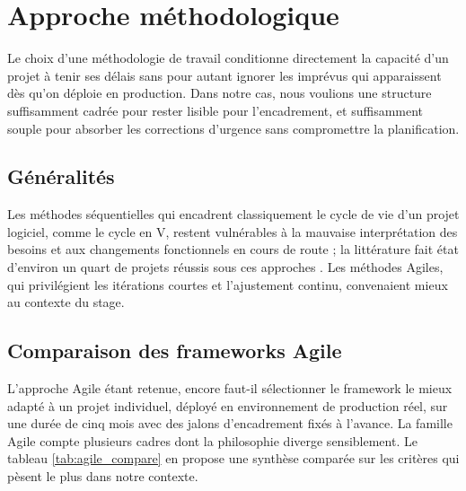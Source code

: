 \section{Approche méthodologique}

    Le choix d'une méthodologie de travail conditionne directement la capacité d'un
    projet à tenir ses délais sans pour autant ignorer les imprévus qui apparaissent dès
    qu'on déploie en production. Dans notre cas, nous voulions une structure suffisamment
    cadrée pour rester lisible pour l'encadrement, et suffisamment souple pour absorber
    les corrections d'urgence sans compromettre la planification.

    \subsection{Généralités}

        Les méthodes séquentielles qui encadrent classiquement le cycle de vie d'un
        projet logiciel, comme le cycle en V, restent vulnérables à la mauvaise
        interprétation des besoins et aux changements fonctionnels en cours de route ;
        la littérature fait état d'environ un quart de projets réussis sous ces
        approches \cite{Agile}. Les méthodes Agiles, qui privilégient les itérations
        courtes et l'ajustement continu, convenaient mieux au contexte du stage.

    \subsection{Comparaison des frameworks Agile}

        L'approche Agile étant retenue, encore faut-il sélectionner le framework le mieux
        adapté à un projet individuel, déployé en
        environnement de production réel, sur une durée de cinq mois avec des
        jalons d'encadrement fixés à l'avance. La famille Agile compte plusieurs
        cadres dont la philosophie diverge sensiblement. Le tableau
        \ref{tab:agile_compare} en propose une synthèse comparée sur les critères
        qui pèsent le plus dans notre contexte.

